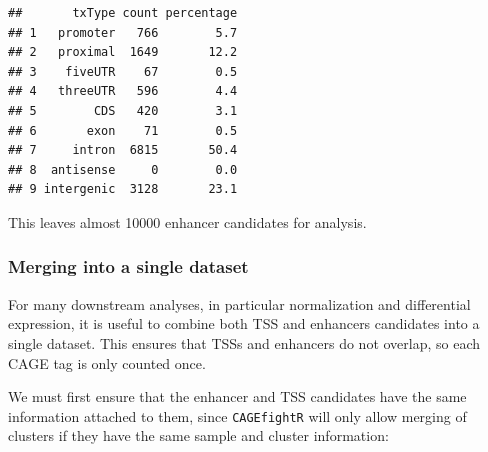 \documentclass[9pt,a4paper,]{extarticle}
\newenvironment{Shaded}{\begin{snugshade}}{\end{snugshade}}
\newcommand{\KeywordTok}[1]{\textcolor[rgb]{0.13,0.29,0.53}{\textbf{{#1}}}}
\newcommand{\StringTok}[1]{\textcolor[rgb]{0.31,0.60,0.02}{{#1}}}
\newcommand{\CommentTok}[1]{\textcolor[rgb]{0.56,0.35,0.01}{\textit{{#1}}}}
\newcommand{\OtherTok}[1]{\textcolor[rgb]{0.56,0.35,0.01}{{#1}}}
\newcommand{\NormalTok}[1]{{#1}}
\begin{document}
\begin{verbatim}
##       txType count percentage
## 1   promoter   766        5.7
## 2   proximal  1649       12.2
## 3    fiveUTR    67        0.5
## 4   threeUTR   596        4.4
## 5        CDS   420        3.1
## 6       exon    71        0.5
## 7     intron  6815       50.4
## 8  antisense     0        0.0
## 9 intergenic  3128       23.1
\end{verbatim}

\begin{Shaded}
\end{Shaded}

This leaves almost 10000 enhancer candidates for analysis.

\subsubsection{Merging into a single dataset}\label{merging-into-a-single-dataset}

For many downstream analyses, in particular normalization and differential expression, it is useful to combine both TSS and enhancers candidates into a single dataset. This ensures that TSSs and enhancers do not overlap, so each CAGE tag is only counted once.

We must first ensure that the enhancer and TSS candidates have the same information attached to them, since \texttt{CAGEfightR} will only allow merging of clusters if they have the same sample and cluster information:

\begin{Shaded}
\end{Shaded}
\end{document}
